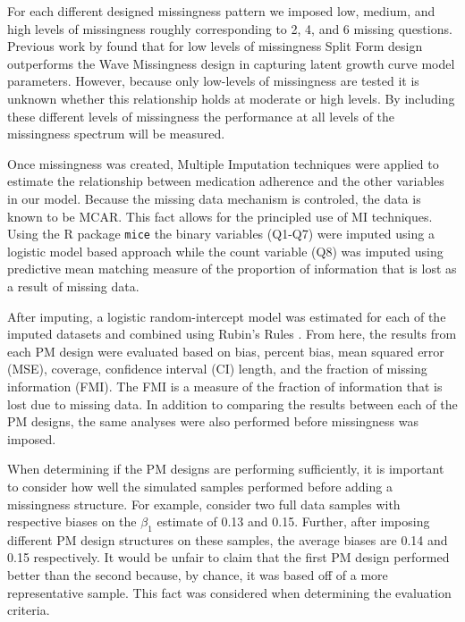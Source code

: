 \documentclass{svjour3}\usepackage[]{graphicx}\usepackage[]{color}
\begin{document}
For each different designed missingness pattern we imposed low, medium, and high levels of missingness roughly corresponding to 2, 4, and 6 missing questions. Previous work by \citet{rhemtulla2014planned} found that for low levels of missingness Split Form design outperforms the Wave Missingness design in capturing latent growth curve model parameters. However, because only low-levels of missingness are tested it is unknown whether this relationship holds at moderate or high levels. By including these different levels of missingness the performance at all levels of the missingness spectrum will be measured. \par
Once missingness was created, Multiple Imputation techniques were applied to estimate the relationship between medication adherence and the other variables in our model. Because the missing data mechanism is controled, the data is known to be MCAR. This fact allows for the principled use of MI techniques. Using the R package \texttt{mice} \citep{mice2011imputation} the binary variables (Q1-Q7) were imputed using a logistic model based approach while the count variable (Q8) was imputed using predictive mean matching measure of the proportion of information that is lost as a result of missing data. \par

After imputing, a logistic random-intercept model was estimated for each of the imputed datasets and combined using Rubin's Rules \citep{rubin2004multiple}. From here, the results from each PM design were evaluated based on bias, percent bias, mean squared error (MSE), coverage, confidence interval (CI) length, and the fraction of missing information (FMI). The FMI is a measure of the fraction of information that is lost due to missing data. In addition to comparing the results between each of the PM designs, the same analyses were also performed before missingness was imposed. \par

When determining if the PM designs are performing sufficiently, it is important to consider how well the simulated samples performed before adding a missingness structure. For example, consider two full data samples with respective biases on the $\beta_1$ estimate of 0.13 and 0.15. Further, after imposing different PM design structures on these samples, the average biases are 0.14 and 0.15 respectively. It would be unfair to claim that the first PM design performed better than the second because, by chance, it was based off of a more representative sample. This fact was considered when determining the evaluation criteria. \par
\end{document}
